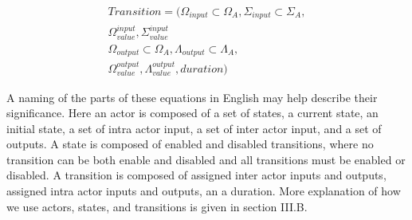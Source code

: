\begin{equation}
\begin{split}
	Transition = (\Omega_{input} \subset \Omega_A, \Sigma_{input} \subset \Sigma_A,\\
	\Omega_{value}^{input}, \Sigma_{value}^{input} \\
	\Omega_{output} \subset \Omega_A, \Lambda_{output} \subset \Lambda_A, \\
	\Omega_{value}^{output}, \Lambda_{value}^{output}, duration)
 \label{eq:transition}
 \end{split}
\end{equation}

A naming of the parts of these equations in English may help describe their significance. Here an actor is composed of a set of states, a current state, an initial state, a set of intra actor input, a set of inter actor input, and a set of outputs. A state is composed of enabled and disabled transitions, where no transition can be both enable and disabled and all transitions must be enabled or disabled. A transition is composed of assigned inter actor inputs and outputs, assigned intra actor inputs and outputs, an a duration. More explanation of how we use actors, states, and transitions is given in section III.B.

